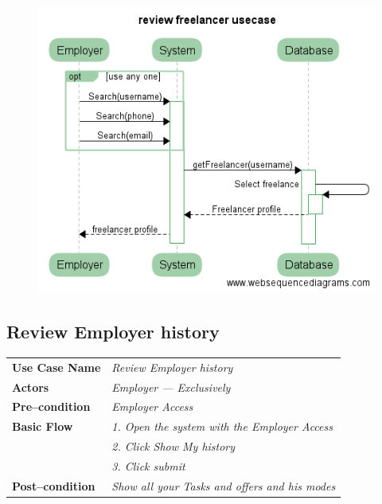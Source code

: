 \documentclass{article}
\begin{document}
\begin{figure}[ht!]
\centering
\includegraphics[width=128mm]{Search_freelancer_usecase.png}
\end{figure}


\newpage
\subsection{Review Employer history}
    \begin{tabular}{ l | l }
    \toprule
      \rowcolor{LightCyan}
      \textbf{Use Case Name}    & \textit{Review Employer history}\\
      \textbf{Actors}           & \textit{Employer --- Exclusively}\\
      \rowcolor{LightCyan}
      \textbf{Pre--condition}   & \textit{Employer Access}\\
      \textbf{Basic Flow}       & \textit{1. Open the system with the Employer Access}\\
                                & \textit{2. Click Show My history}\\
                                & \textit{3. Click submit}\\
      \rowcolor{LightCyan}
      \textbf{Post--condition}  & \textit{Show all your Tasks and offers and his modes}\\
    \toprule
    \end{tabular}
\end{document}
